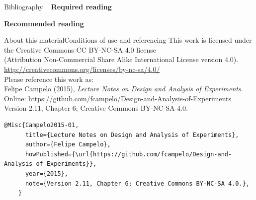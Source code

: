 \documentclass[t]{beamer}
\begin{document}

\begin{ftst}
{Bibliography}
{\ }
\scriptsize
\textbf{Required reading}

\benums 
\eenum

\textbf{Recommended reading}

\benums 
\eenum
\end{ftst}


\begin{ftstf}{About this material}{Conditions of use and referencing}
\centering\footnotesize This work is licensed under the Creative Commons CC BY-NC-SA 4.0 license\\(Attribution Non-Commercial Share Alike International License version 4.0).\\
\vhalf
\url{http://creativecommons.org/licenses/by-nc-sa/4.0/}\\
\vone
\footnotesize Please reference this work as:\\
\footnotesize \flushleft Felipe Campelo (2015), \textit{Lecture Notes on Design and Analysis of Experiments}.\\Online: {\scriptsize\url{https://github.com/fcampelo/Design-and-Analysis-of-Experiments}}\\
Version 2.11, Chapter 6; Creative Commons BY-NC-SA 4.0.\\

\begin{Verbatim}[fontsize=\tiny]
    @Misc{Campelo2015-01,
      title={Lecture Notes on Design and Analysis of Experiments},
      author={Felipe Campelo},
      howPublished={\url{https://github.com/fcampelo/Design-and-Analysis-of-Experiments}},
      year={2015},
      note={Version 2.11, Chapter 6; Creative Commons BY-NC-SA 4.0.},
    }
\end{Verbatim}

\end{ftstf}
\end{document}
